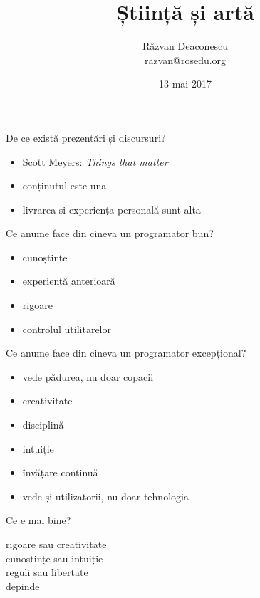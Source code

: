 \documentclass{beamer}
\title[Știință și artă]{Știință și artă}
\institute{CDL, ROSEdu}
\author[Răzvan Deaconescu]{Răzvan Deaconescu \\
razvan@rosedu.org}
\date{13 mai 2017}
\begin{document}
\frame{\titlepage}

\begin{frame}{De ce există prezentări și discursuri?}
  \begin{itemize}
    \pause
    \item Scott Meyers: \textit{Things that matter}
    \pause
    \item conținutul este una
    \pause
    \item livrarea și experiența personală sunt alta
  \end{itemize}
\end{frame}

\begin{frame}{Ce anume face din cineva un programator bun?}
  \begin{itemize}
    \pause
    \item cunoștințe
    \item experiență anterioară
    \item rigoare
    \item controlul utilitarelor
  \end{itemize}
\end{frame}

\begin{frame}{Ce anume face din cineva un programator excepțional?}
  \begin{itemize}
    \pause
    \item vede pădurea, nu doar copacii
    \item creativitate
    \item disciplină
    \item intuiție
    \item învățare continuă
    \item vede și utilizatorii, nu doar tehnologia
  \end{itemize}
\end{frame}

\begin{frame}{Ce e mai bine?}
  \begin{center}
    \pause
    rigoare sau creativitate \\
    \vspace{0.5cm}
    \pause
    cunoștințe sau intuiție \\
    \vspace{0.5cm}
    \pause
    reguli sau libertate\\
    \vspace{1cm}
    \pause
    \Large{depinde}
  \end{center}
\end{frame}
\end{document}
